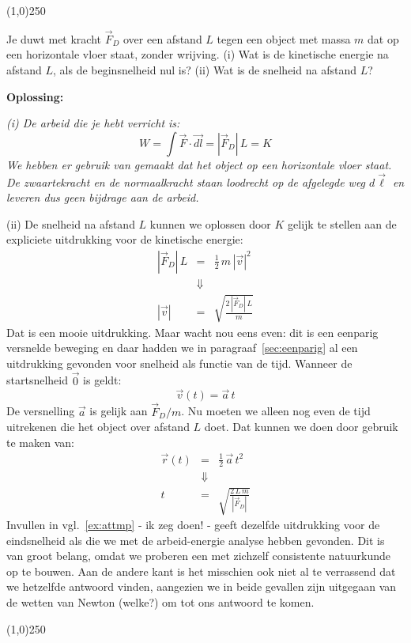 \begin{center}
\line(1,0){250}
\end{center}
\begin{voorbeeld} 
Je duwt met kracht $\vec{F}_D$ over een afstand $L$ tegen een object met massa $m$ dat op een
horizontale vloer staat, zonder wrijving. (i) Wat is de kinetische energie na afstand $L$, als de
beginsnelheid nul is? (ii) Wat is de snelheid na afstand $L$?

{\bf Oplossing: }{\it (i) De arbeid die je hebt verricht is:
\begin{equation}
W=\int \vec{F}\cdot\vec{d l} = |\vec{F}_D|\,L= K
\end{equation}
We hebben er gebruik van gemaakt dat het object op een horizontale vloer staat. De zwaartekracht
en de normaalkracht staan loodrecht op de afgelegde weg $d\vec{\ell}$ en leveren dus geen
bijdrage aan de arbeid. 

(ii) De snelheid na afstand $L$ kunnen we oplossen door $K$ gelijk te stellen aan de expliciete
uitdrukking voor de kinetische energie:
\begin{eqnarray}
|\vec{F}_D|\, L & = & \frac{1}{2}\,m\,|\vec{v}|^2 \\
& \Downarrow & \\
|\vec{v}| &  = & \sqrt{\frac{2\,|\vec{F}_D|\,L}{m}}
\end{eqnarray}
Dat is een mooie uitdrukking. Maar wacht nou eens even: dit is een eenparig versnelde 
beweging en daar hadden we in paragraaf~\ref{sec:eenparig} al een uitdrukking gevonden
voor snelheid als functie van de tijd. Wanneer de startsnelheid $\vec{0}$ is geldt:
\begin{equation}\label{ex:attmp}
\vec{v}(t) = \vec{a}\,t
\end{equation}
De versnelling $\vec{a}$ is gelijk aan $\vec{F}_D/m$. Nu moeten we alleen nog even de
tijd uitrekenen die het object over afstand $L$ doet. Dat kunnen we doen door gebruik
te maken van:
\begin{eqnarray}
\vec{r}(t) & = & \frac{1}{2}\,\vec{a}\,t^2 \\
 & \Downarrow & \\
 t & = & \sqrt{\frac{2\,L\,m}{|\vec{F}_D|}}
\end{eqnarray}
Invullen in vgl.~\ref{ex:attmp} - ik zeg doen! - geeft dezelfde uitdrukking voor de eindsnelheid
als die we met de arbeid-energie analyse hebben gevonden. Dit is van groot belang, omdat
we proberen een met zichzelf consistente natuurkunde op te bouwen. Aan de andere kant
is het misschien ook niet al te verrassend dat we hetzelfde antwoord vinden, aangezien
we in beide gevallen zijn uitgegaan van de wetten van Newton (welke?) om tot ons antwoord te
komen.
}
\end{voorbeeld}
\begin{center}
\line(1,0){250}
\end{center}

